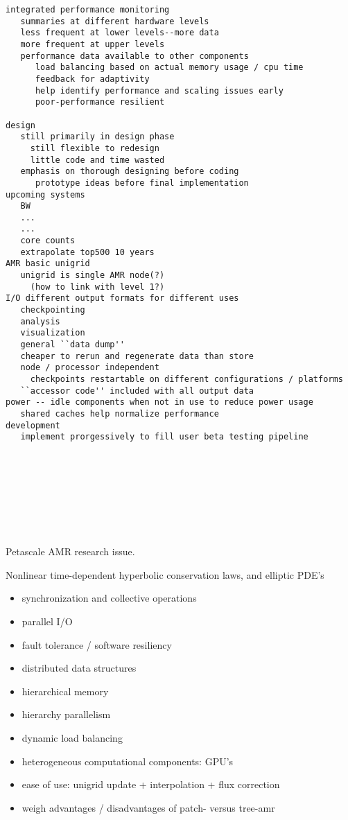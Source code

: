 \documentclass{article}
\begin{document}
\begin{verbatim}
integrated performance monitoring
   summaries at different hardware levels
   less frequent at lower levels--more data
   more frequent at upper levels
   performance data available to other components
      load balancing based on actual memory usage / cpu time
      feedback for adaptivity
      help identify performance and scaling issues early
      poor-performance resilient

design
   still primarily in design phase
     still flexible to redesign
     little code and time wasted
   emphasis on thorough designing before coding
      prototype ideas before final implementation
upcoming systems
   BW
   ...
   ...
   core counts
   extrapolate top500 10 years
AMR basic unigrid
   unigrid is single AMR node(?)
     (how to link with level 1?)
I/O different output formats for different uses
   checkpointing
   analysis
   visualization
   general ``data dump''
   cheaper to rerun and regenerate data than store
   node / processor independent
     checkpoints restartable on different configurations / platforms
   ``accessor code'' included with all output data
power -- idle components when not in use to reduce power usage
   shared caches help normalize performance
development
   implement prorgessively to fill user beta testing pipeline
    

       
   

       
   
   

\end{verbatim}

Petascale AMR research issue.


Nonlinear time-dependent hyperbolic conservation laws, and elliptic PDE's

\begin{itemize}
\item synchronization and collective operations
\item parallel I/O
\item fault tolerance / software resiliency
\item distributed data structures
\item hierarchical memory
\item hierarchy parallelism
\item dynamic load balancing
\item heterogeneous computational components: GPU's
\item ease of use: unigrid update + interpolation + flux correction
\item weigh advantages / disadvantages of patch- versus tree-amr
\end{itemize}
\end{document}
